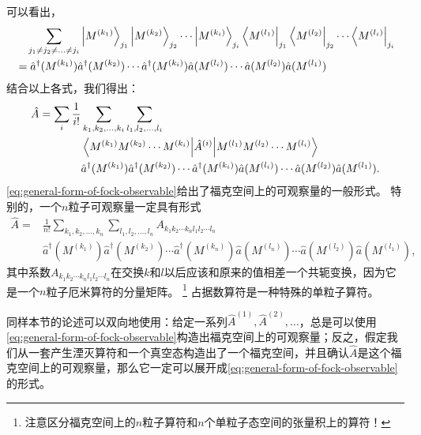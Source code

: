 \documentclass[hyperref, UTF8, a4paper]{ctexart}
\begin{document}
可以看出，
\[
    \begin{aligned}
        &\quad \sum_{j_1 \neq j_2 \neq \ldots \neq j_i} \ket{M^{(k_1)}}_{j_1} \ket{M^{(k_2)}}_{j_2} \cdots \ket{M^{(k_i)}}_{j_i} 
        \bra{M^{(l_1)}}_{j_1} \bra{M^{(l_2)}}_{j_2} \cdots \bra{M^{(l_i)}}_{j_i} \\
        &= \hat{a}^\dagger (M^{(k_1)}) \hat{a}^\dagger (M^{(k_2)}) \cdots \hat{a}^\dagger (M^{(k_i)}) \hat{a} (M^{(l_i)}) \cdots \hat{a} (M^{(l_2)}) \hat{a} (M^{(l_1)})  
    \end{aligned}
\]
结合以上各式，我们得出：
\begin{equation}
    \begin{aligned}
        \hat{A} = \sum_i \frac{1}{i!} &\sum_{k_1, k_2, \ldots, k_i} \sum_{l_1, l_2, \ldots, l_i} \\
        &\mel{M^{(k_1)} M^{(k_2)} \cdots M^{(k_i)}}{\hat{A}^{(i)}}{M^{(l_1)} M^{(l_2)} \cdots M^{(l_i)}} \\
        &\hat{a}^\dagger (M^{(k_1)}) \hat{a}^\dagger (M^{(k_2)}) \cdots \hat{a}^\dagger (M^{(k_i)}) \hat{a} (M^{(l_i)}) \cdots \hat{a} (M^{(l_2)}) \hat{a} (M^{(l_1)}).
        \label{eq:general-form-of-fock-observable}
    \end{aligned}
\end{equation}
\eqref{eq:general-form-of-fock-observable}给出了福克空间上的可观察量的一般形式。
特别的，一个$n$粒子可观察量一定具有形式
\begin{equation}
    \begin{aligned}
        \hat{A} = &\frac{1}{n!} \sum_{k_1, k_2, \ldots, k_n} \sum_{l_1, l_2, \ldots, l_n} A_{k_1 k_2 \cdots k_n l_1 l_2 \cdots l_n} \\
        &\hat{a}^\dagger (M^{(k_1)}) \hat{a}^\dagger (M^{(k_2)}) \cdots \hat{a}^\dagger (M^{(k_n)}) \hat{a} (M^{(l_n)}) \cdots \hat{a} (M^{(l_2)}) \hat{a} (M^{(l_1)}),
    \end{aligned}
    \label{eq:n-particles-observable}
\end{equation}
其中系数$A_{k_1 k_2 \cdots k_n l_1 l_2 \cdots l_n}$在交换$k$和$l$以后应该和原来的值相差一个共轭变换，因为它是一个$n$粒子厄米算符的分量矩阵。%
\footnote{注意区分福克空间上的$n$粒子算符和$n$个单粒子态空间的张量积上的算符！}%
占据数算符是一种特殊的单粒子算符。

同样本节的论述可以双向地使用：给定一系列$\hat{A}^{(1)}, \hat{A}^{(2)}, \ldots$，总是可以使用\eqref{eq:general-form-of-fock-observable}构造出福克空间上的可观察量；反之，假定我们从一套产生湮灭算符和一个真空态构造出了一个福克空间，并且确认$\hat{A}$是这个福克空间上的可观察量，那么它一定可以展开成\eqref{eq:general-form-of-fock-observable}的形式。
\end{document}
